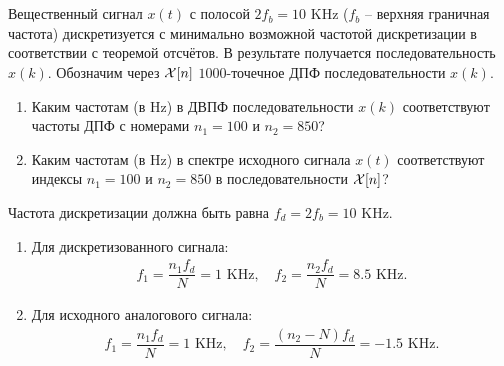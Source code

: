 \section{}
Вещественный сигнал $x(t)$ с полосой $2f_b = 10$ KHz ($f_b$ -- верхняя граничная частота) дискретизуется с минимально возможной частотой дискретизации в соответствии с теоремой отсчётов. В результате получается последовательность $x(k)$. Обозначим через $\mathcal{X}[n]$ $1000$-точечное ДПФ последовательности $x(k)$.

\begin{enumerate}[label=(\alph*)]
	\item Каким частотам (в Hz) в ДВПФ последовательности $x(k)$ соответствуют частоты ДПФ с номерами $n_1 = 100$ и $n_2 = 850$?
	
	\item Каким частотам (в Hz) в спектре исходного сигнала $x(t)$ соответствуют индексы $n_1 = 100$ и $n_2 = 850$ в последовательности $\mathcal{X}[n]$?
\end{enumerate}

Частота дискретизации должна быть равна $f_d = 2f_b = 10$ KHz.

\begin{enumerate}[label=(\alph*)]
	\item Для дискретизованного сигнала:
	\begin{align*}
		f_1 = \dfrac{n_1 f_d}{N} = 1\text{ KHz}, \quad f_2 = \dfrac{n_2 f_d}{N} = 8.5\text{ KHz}.
	\end{align*}
	\item Для исходного аналогового сигнала:
	\begin{align*}
		f_1 = \dfrac{n_1 f_d}{N} = 1\text{ KHz}, \quad f_2 = \dfrac{(n_2 - N)f_d}{N} = -1.5\text{ KHz}.
	\end{align*}
\end{enumerate}
